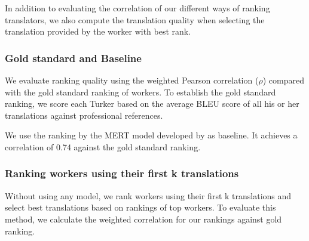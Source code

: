 \documentclass[11pt,letterpaper]{article}
\begin{document}
In addition to evaluating the correlation of our different ways of ranking translators, we also compute the translation quality when selecting the translation provided by the worker with best rank.



\subsubsection{Gold standard and Baseline}
We evaluate ranking quality using the weighted Pearson correlation ($\rho$) compared with the gold standard ranking of workers. 
To establish the gold standard ranking, we score each Turker based on the average BLEU score of all his or her translations against professional references.

We use the ranking by the MERT model developed by  as baseline. It achieves a correlation of 0.74 against the gold standard ranking. 




\subsubsection{Ranking workers using their first k translations}
 Without using any model, we rank workers using their first k translations and select best translations based on rankings of top workers. To evaluate this method, we calculate the weighted correlation for our rankings against gold ranking. 
\end{document}
